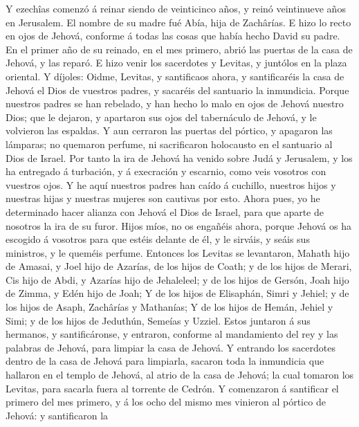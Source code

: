  Y ezechîas comenzó á reinar siendo de veinticinco años, y
reinó veintinueve años en Jerusalem. El nombre de su madre fué Abía,
hija de Zachârías.  E hizo lo recto en ojos de Jehová,
conforme á todas las cosas que había hecho David su padre. 
En el primer año de su reinado, en el mes primero, abrió las puertas de
la casa de Jehová, y las reparó.  E hizo venir los
sacerdotes y Levitas, y juntólos en la plaza oriental.  Y
díjoles: Oidme, Levitas, y santificaos ahora, y santificaréis la casa de
Jehová el Dios de vuestros padres, y sacaréis del santuario la
inmundicia.  Porque nuestros padres se han rebelado, y han
hecho lo malo en ojos de Jehová nuestro Dios; que le dejaron, y
apartaron sus ojos del tabernáculo de Jehová, y le volvieron las
espaldas.  Y aun cerraron las puertas del pórtico, y
apagaron las lámparas; no quemaron perfume, ni sacrificaron holocausto
en el santuario al Dios de Israel.  Por tanto la ira de
Jehová ha venido sobre Judá y Jerusalem, y los ha entregado á turbación,
y á execración y escarnio, como veis vosotros con vuestros ojos.
 Y he aquí nuestros padres han caído á cuchillo, nuestros
hijos y nuestras hijas y nuestras mujeres son cautivas por esto.
 Ahora pues, yo he determinado hacer alianza con Jehová el
Dios de Israel, para que aparte de nosotros la ira de su furor.
 Hijos míos, no os engañéis ahora, porque Jehová os ha
escogido á vosotros para que estéis delante de él, y le sirváis, y seáis
sus ministros, y le queméis perfume.  Entonces los Levitas
se levantaron, Mahath hijo de Amasai, y Joel hijo de Azarías, de los
hijos de Coath; y de los hijos de Merari, Cis hijo de Abdi, y Azarías
hijo de Jehaleleel; y de los hijos de Gersón, Joah hijo de Zimma, y Edén
hijo de Joah;  Y de los hijos de Elisaphán, Simri y Jehiel;
y de los hijos de Asaph, Zachârías y Mathanías;  Y de los
hijos de Hemán, Jehiel y Simi; y de los hijos de Jeduthún, Semeías y
Uzziel.  Estos juntaron á sus hermanos, y santificáronse, y
entraron, conforme al mandamiento del rey y las palabras de Jehová, para
limpiar la casa de Jehová.  Y entrando los sacerdotes
dentro de la casa de Jehová para limpiarla, sacaron toda la inmundicia
que hallaron en el templo de Jehová, al atrio de la casa de Jehová; la
cual tomaron los Levitas, para sacarla fuera al torrente de Cedrón.
 Y comenzaron á santificar el primero del mes primero, y á
los ocho del mismo mes vinieron al pórtico de Jehová: y santificaron la
